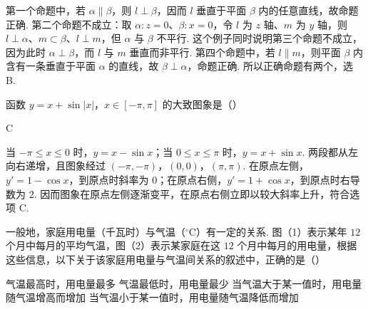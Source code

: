 \begin{solution}
第一个命题中，若 \(\alpha\parallel\beta\)，则 \(l\perp\beta\)，因而 \(l\) 垂直于平面 \(\beta\) 内的任意直线，故命题正确. 第二个命题不成立：取 \(\alpha\colon z=0\)、\(\beta\colon x=0\)，令 \(l\) 为 \(z\) 轴、\(m\) 为 \(y\) 轴，则 \(l\perp\alpha\)、\(m\subset\beta\)、\(l\perp m\)，但 \(\alpha\) 与 \(\beta\) 不平行. 这个例子同时说明第三个命题不成立，因为此时 \(\alpha\perp\beta\)，而 \(l\) 与 \(m\) 垂直而非平行. 第四个命题中，若 \(l\parallel m\)，则平面 \(\beta\) 内含有一条垂直于平面 \(\alpha\) 的直线，故 \(\beta\perp\alpha\)，命题正确. 所以正确命题有两个，选 B.
\end{solution}

\begin{problem}
函数 \(y = x + \sin |x|\)，\(x \in [-\pi, \pi]\) 的大致图象是（\quad）

    {}
    {}
    {}
\end{problem}

\begin{answer}
C
\end{answer}

\begin{solution}
当 \(-\pi\leqslant x\leqslant0\) 时，\(y=x-\sin x\)；当 \(0\leqslant x\leqslant\pi\) 时，\(y=x+\sin x\). 两段都从左向右递增，且图象经过 \((-\pi,-\pi)\)，\((0,0)\)，\((\pi,\pi)\). 在原点左侧，\(y'=1-\cos x\)，到原点时斜率为 \(0\)；在原点右侧，\(y'=1+\cos x\)，到原点时右导数为 \(2\). 因而图象在原点左侧逐渐变平，在原点右侧立即以较大斜率上升，符合选项 C.
\end{solution}

\begin{problem}
一般地，家庭用电量（千瓦时）与气温（\(^{\circ}\mathrm{C}\)）有一定的关系. 图（1）表示某年 \(12\) 个月中每月的平均气温，图（2）表示某家庭在这 \(12\) 个月中每月的用电量，根据这些信息，以下关于该家庭用电量与气温间关系的叙述中，正确的是（\quad）


\choices
    {气温最高时，用电量最多}
    {气温最低时，用电量最少}
    {当气温大于某一值时，用电量随气温增高而增加}
    {当气温小于某一值时，用电量随气温降低而增加}
\end{problem}

